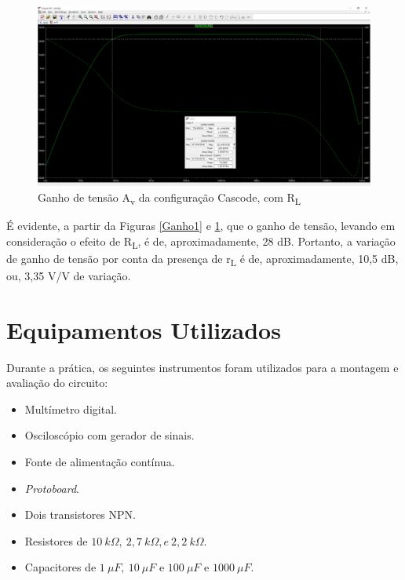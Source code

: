 \documentclass[journal, a4paper]{IEEEtran}
\newcommand\tab[1][1cm]{\hspace*{#1}}
\begin{document}
    	     \begin{figure}[H]
        		\begin{center}
        		\includegraphics[width=\columnwidth]{Ganho2.jpeg}
        		\caption{Ganho de tensão A\textsubscript{v} da configuração Cascode, com R\textsubscript{L}}
        		\label{Ganho2}
        		\end{center}
    	    \end{figure}
    	  \tab É evidente, a partir da Figuras \ref{Ganho1} e \ref{Ganho2}, que o ganho de tensão, levando em consideração o efeito de R\textsubscript{L}, é de, aproximadamente, 28 dB. Portanto, a variação de ganho de tensão por conta da presença de r\textsubscript{L }é de, aproximadamente, 10,5 dB, ou, 3,35 V/V de variação.
        
        
        
        
        
        
\section{Equipamentos Utilizados}
    \tab Durante a prática, os seguintes instrumentos foram utilizados para a montagem e avaliação do circuito:
     \begin{itemize}
        \item Multímetro digital.
        
        \item Osciloscópio com gerador de sinais.
        
        \item Fonte de alimentação contínua.
        
        \item \textit{Protoboard}.
        
        \item Dois transistores NPN.
        
        \item Resistores de $10 \: k\Omega,\: 2,7 \: k\Omega, e \:2,2 \: k\Omega$.
        
        \item Capacitores de $1 \: \mu F,\: 10 \: \mu F$ e $100 \: \mu F$ e $1000 \: \mu F$.
        
     \end{itemize}
    
\end{document}

